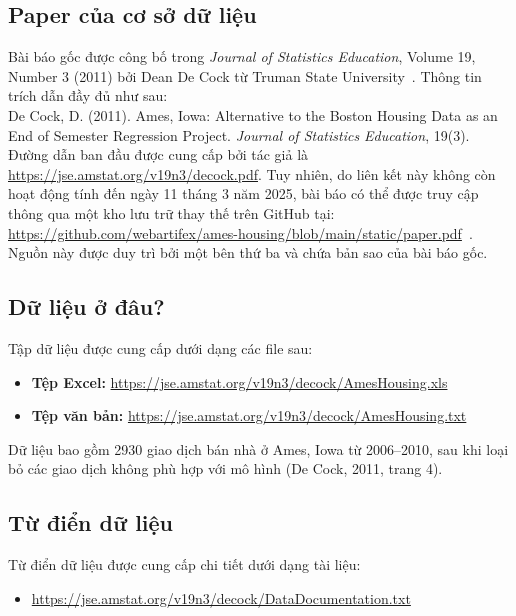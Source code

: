 \documentclass{article}
\begin{document}
\subsection{Paper của cơ sở dữ liệu}
Bài báo gốc được công bố trong \textit{Journal of Statistics Education}, Volume 19, Number 3 (2011) bởi Dean De Cock từ Truman State University~\cite{decock2011}. Thông tin trích dẫn đầy đủ như sau: \\
De Cock, D. (2011). Ames, Iowa: Alternative to the Boston Housing Data as an End of Semester Regression Project. \textit{Journal of Statistics Education}, 19(3). \\
Đường dẫn ban đầu được cung cấp bởi tác giả là \url{https://jse.amstat.org/v19n3/decock.pdf}. Tuy nhiên, do liên kết này không còn hoạt động tính đến ngày 11 tháng 3 năm 2025, bài báo có thể được truy cập thông qua một kho lưu trữ thay thế trên GitHub tại: \url{https://github.com/webartifex/ames-housing/blob/main/static/paper.pdf}~\cite{github2025}. Nguồn này được duy trì bởi một bên thứ ba và chứa bản sao của bài báo gốc.

\subsection{Dữ liệu ở đâu?}

Tập dữ liệu được cung cấp dưới dạng các file sau:

\begin{itemize}[label=$\bullet$]
    \item \textbf{Tệp Excel:} \href{https://jse.amstat.org/v19n3/decock/AmesHousing.xls}{https://jse.amstat.org/v19n3/decock/AmesHousing.xls}
    \item \textbf{Tệp văn bản:} \href{https://jse.amstat.org/v19n3/decock/AmesHousing.txt}{https://jse.amstat.org/v19n3/decock/AmesHousing.txt}
\end{itemize}

Dữ liệu bao gồm 2930 giao dịch bán nhà ở Ames, Iowa từ 2006--2010, sau khi loại bỏ các giao dịch không phù hợp với mô hình (De Cock, 2011, trang 4).

\subsection{Từ điển dữ liệu}

Từ điển dữ liệu được cung cấp chi tiết dưới dạng tài liệu:

\begin{itemize}[label=$\bullet$]
    \item \href{https://jse.amstat.org/v19n3/decock/DataDocumentation.txt}{https://jse.amstat.org/v19n3/decock/DataDocumentation.txt}
\end{itemize}
\end{document}
